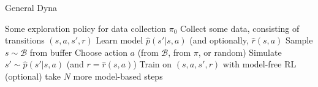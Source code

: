 \begin{algorithm}[t!]
\caption{General Dyna}
\begin{algorithmic}[1]
\label{alg:dynagen}
\REQUIRE Some exploration policy for data collection $\pi_0$
\STATE Collect some data, consisting of transitions $(s,a,s',r)$
\STATE Learn model $\hat{p}(s'|s,a)$ (and optionally, $\hat{r}(s,a)$
\STATE Sample $s\sim \mathcal{B}$ from buffer
\STATE Choose action $a$ (from $\mathcal{B}$, from $\pi$, or random)
\STATE Simulate $s'\sim\hat{p}(s'|s,a)$ (and $r=\hat{r}(s,a)$)
\STATE Train on $(s,a,s',r)$ with model-free RL
\STATE (optional) take $N$ more model-based steps
\ENDFOR
\end{algorithmic}
\end{algorithm}